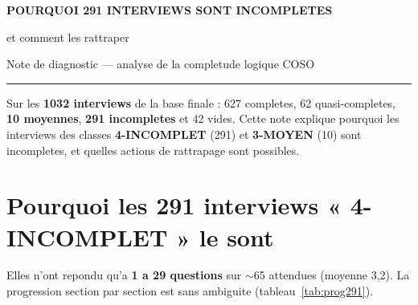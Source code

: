\documentclass[11pt,a4paper]{article}
\begin{document}
\begin{center}
  {\LARGE\bfseries POURQUOI 291 INTERVIEWS SONT INCOMPLETES\par}
  \vspace{0.3em}
  {\large et comment les rattraper\par}
  \vspace{0.4em}
  {\normalsize Note de diagnostic --- analyse de la completude logique COSO\par}
\end{center}
\vspace{0.5em}
\hrule
\vspace{0.8em}

Sur les \textbf{1032 interviews} de la base finale : 627 completes,
62 quasi-completes, \textbf{10 moyennes}, \textbf{291 incompletes} et
42 vides. Cette note explique pourquoi les interviews des classes
\textbf{4-INCOMPLET} (291) et \textbf{3-MOYEN} (10) sont incompletes, et
quelles actions de rattrapage sont possibles.

\section{Pourquoi les 291 interviews « 4-INCOMPLET » le sont}

Elles n'ont repondu qu'a \textbf{1 a 29 questions} sur $\sim$65 attendues
(moyenne 3,2). La progression section par section est sans ambiguite
(tableau~\ref{tab:prog291}).
\end{document}
